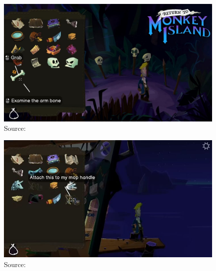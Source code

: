 
\begin{figure}[H]
\centering
\includegraphics[width=.7\linewidth]{img/RtMI1.png}
\caption{Source:  \cite{}}
\label{fig:RtMI1}
\end{figure}

\begin{figure}[H]
\centering
\includegraphics[width=.7\linewidth]{img/RtMI2.png}
\caption{Source:  \cite{}}
\label{fig:RtMI2}
\end{figure}
